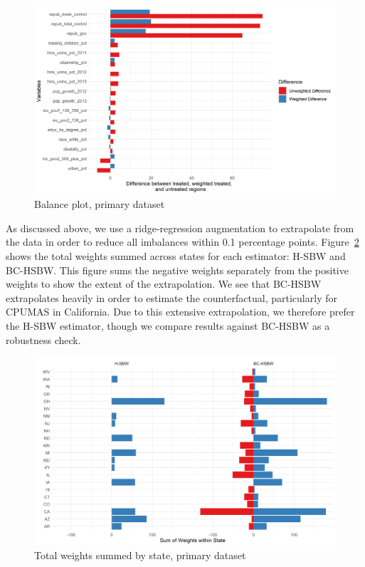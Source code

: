 \documentclass[aoas]{imsart}
\theoremstyle{plain}
\theoremstyle{remark}
\begin{document}
\begin{figure}[B]
\begin{center}
    \caption{Balance plot, primary dataset}
    \label{fig:loveplotc1}
    \includegraphics[scale=0.6]{01_Plots/balance-plot-etu.png}
\end{center}
\end{figure}

As discussed above, we use a ridge-regression augmentation to extrapolate from the data in order to reduce all imbalances within 0.1 percentage points. Figure~\ref{fig:statewghts} shows the total weights summed across states for each estimator: H-SBW and BC-HSBW. This figure sums the negative weights separately from the positive weights to show the extent of the extrapolation. We see that BC-HSBW extrapolates heavily in order to estimate the counterfactual, particularly for CPUMAS in California. Due to this extensive extrapolation, we therefore prefer the H-SBW estimator, though we compare results against BC-HSBW as a robustness check.

\begin{figure}[B]
\begin{center}
    \caption{Total weights summed by state, primary dataset}
    \label{fig:statewghts}
    \includegraphics[scale=0.6]{01_Plots/weights-by-state-hsbw-c1.png}
\end{center}
\end{figure}
\end{document}
